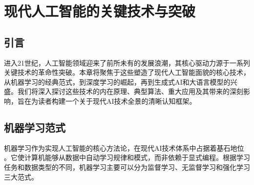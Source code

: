 \chapter{现代人工智能的关键技术与突破}
\label{chap:modern_ai_tech}

\section{引言}
\label{sec:intro_chap2}
进入21世纪，人工智能领域迎来了前所未有的发展浪潮，其核心驱动力源于一系列关键技术的革命性突破。本章将聚焦于这些塑造了现代人工智能面貌的核心技术，从机器学习的经典范式，到深度学习的崛起，再到生成式AI和大语言模型的兴盛。我们将深入探讨这些技术的内在原理、典型算法、重大应用及其带来的深刻影响，旨在为读者构建一个关于现代AI技术全景的清晰认知框架。

\section{机器学习范式}
\label{sec:ml_paradigms}
机器学习作为实现人工智能的核心方法论，在现代AI技术体系中占据着基石地位 \cite{mahesh2020machine}。它使计算机能够从数据中自动学习规律和模式，而非依赖于显式编程。根据学习任务和数据类型的不同，机器学习主要可以分为监督学习、无监督学习和强化学习三大范式。

